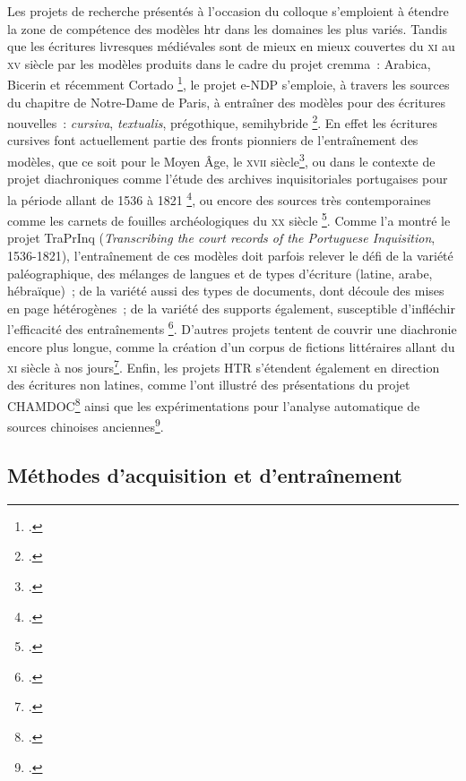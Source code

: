 \documentclass[a4paper,12pt,twoside]{book}
\newcommand{\siecle}[1]{\textsc{#1}\ieme}
\begin{document}
				Les projets de recherche présentés à l'occasion du colloque s'emploient
				à étendre la zone de compétence des modèles \gls{htr} dans les domaines les plus variés.
				Tandis que les écritures livresques médiévales sont de
				mieux en mieux couvertes du \siecle{xi} au \siecle{xv} siècle par les modèles produits
				dans le cadre du projet \gls{cremma}~: Arabica, Bicerin et récemment Cortado
				\footcite{campsCremmaLabProjectsTranscription2022}, 
				le projet e-NDP
				s'emploie, à travers les sources du chapitre de Notre-Dame de Paris, à
				entraîner des modèles pour des écritures nouvelles~: \textit{cursiva},
				\textit{textualis}, prégothique, semihybride
				\footcite{torresaguilarModelisationAffinageHTR2022}.
				En effet les écritures
				cursives font actuellement partie des fronts pionniers de l'entraînement
				des modèles, que ce soit pour le Moyen Âge, le \siecle{xvii} siècle\footcite{paupeCursiveXVIIeSiecle2022}, ou dans le contexte de projet
				diachroniques comme l'étude des archives inquisitoriales portugaises
				pour la période allant de 1536 à 1821
				\footcite{baudryArchivesInquisitorialesPortugal2022}, ou encore des sources très contemporaines comme les carnets de fouilles archéologiques du \siecle{xx} siècle
				\footcite{tufferyRetourExperiencesUtilisation2022}.
				Comme l'a montré
				le projet TraPrInq (\textit{Transcribing the court records of the Portuguese Inquisition}, 1536-1821), l'entraînement de ces modèles doit
				parfois relever le défi de la variété paléographique, des mélanges de
				langues et de types d'écriture (latine, arabe, hébraïque)~; de la
				variété aussi des types de documents, dont découle des mises en page
				hétérogènes~; de la variété des supports également, susceptible
				d'infléchir l'efficacité des entraînements
				\footcite{baudryArchivesInquisitorialesPortugal2022}.
				D'autres projets tentent de couvrir une diachronie encore plus longue, comme la création
				d'un corpus de fictions littéraires allant du \siecle{xi} siècle à nos jours\footcite{campsCremmaLabProjectsTranscription2022}. 
				Enfin, les projets HTR
				s'étendent également en direction des écritures non latines, comme l'ont
				illustré des présentations du projet CHAMDOC\footcite{schweyerAnalyseReconnaissanceIndexation2022} ainsi que les
				expérimentations pour l'analyse automatique de sources chinoises
				anciennes\footcite{bizais-lilligExperimentationsPourAnalyse2022}.
			
			\subsection{Méthodes d'acquisition et d'entraînement}
			
\end{document}
